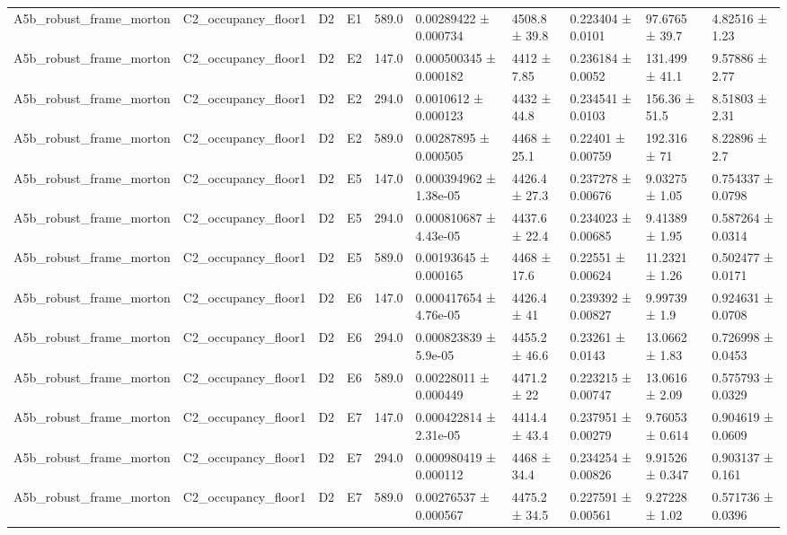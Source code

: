 \begin{table}
\begin{tabular}{llllllllll}
A5b\_robust\_frame\_morton & C2\_occupancy\_floor1 & D2 & E1 & 589.0 & 0.00289422 ± 0.000734 & 4508.8 ± 39.8 & 0.223404 ± 0.0101 & 97.6765 ± 39.7 & 4.82516 ± 1.23 \\
A5b\_robust\_frame\_morton & C2\_occupancy\_floor1 & D2 & E2 & 147.0 & 0.000500345 ± 0.000182 & 4412 ± 7.85 & 0.236184 ± 0.0052 & 131.499 ± 41.1 & 9.57886 ± 2.77 \\
A5b\_robust\_frame\_morton & C2\_occupancy\_floor1 & D2 & E2 & 294.0 & 0.0010612 ± 0.000123 & 4432 ± 44.8 & 0.234541 ± 0.0103 & 156.36 ± 51.5 & 8.51803 ± 2.31 \\
A5b\_robust\_frame\_morton & C2\_occupancy\_floor1 & D2 & E2 & 589.0 & 0.00287895 ± 0.000505 & 4468 ± 25.1 & 0.22401 ± 0.00759 & 192.316 ± 71 & 8.22896 ± 2.7 \\
A5b\_robust\_frame\_morton & C2\_occupancy\_floor1 & D2 & E5 & 147.0 & 0.000394962 ± 1.38e-05 & 4426.4 ± 27.3 & 0.237278 ± 0.00676 & 9.03275 ± 1.05 & 0.754337 ± 0.0798 \\
A5b\_robust\_frame\_morton & C2\_occupancy\_floor1 & D2 & E5 & 294.0 & 0.000810687 ± 4.43e-05 & 4437.6 ± 22.4 & 0.234023 ± 0.00685 & 9.41389 ± 1.95 & 0.587264 ± 0.0314 \\
A5b\_robust\_frame\_morton & C2\_occupancy\_floor1 & D2 & E5 & 589.0 & 0.00193645 ± 0.000165 & 4468 ± 17.6 & 0.22551 ± 0.00624 & 11.2321 ± 1.26 & 0.502477 ± 0.0171 \\
A5b\_robust\_frame\_morton & C2\_occupancy\_floor1 & D2 & E6 & 147.0 & 0.000417654 ± 4.76e-05 & 4426.4 ± 41 & 0.239392 ± 0.00827 & 9.99739 ± 1.9 & 0.924631 ± 0.0708 \\
A5b\_robust\_frame\_morton & C2\_occupancy\_floor1 & D2 & E6 & 294.0 & 0.000823839 ± 5.9e-05 & 4455.2 ± 46.6 & 0.23261 ± 0.0143 & 13.0662 ± 1.83 & 0.726998 ± 0.0453 \\
A5b\_robust\_frame\_morton & C2\_occupancy\_floor1 & D2 & E6 & 589.0 & 0.00228011 ± 0.000449 & 4471.2 ± 22 & 0.223215 ± 0.00747 & 13.0616 ± 2.09 & 0.575793 ± 0.0329 \\
A5b\_robust\_frame\_morton & C2\_occupancy\_floor1 & D2 & E7 & 147.0 & 0.000422814 ± 2.31e-05 & 4414.4 ± 43.4 & 0.237951 ± 0.00279 & 9.76053 ± 0.614 & 0.904619 ± 0.0609 \\
A5b\_robust\_frame\_morton & C2\_occupancy\_floor1 & D2 & E7 & 294.0 & 0.000980419 ± 0.000112 & 4468 ± 34.4 & 0.234254 ± 0.00826 & 9.91526 ± 0.347 & 0.903137 ± 0.161 \\
A5b\_robust\_frame\_morton & C2\_occupancy\_floor1 & D2 & E7 & 589.0 & 0.00276537 ± 0.000567 & 4475.2 ± 34.5 & 0.227591 ± 0.00561 & 9.27228 ± 1.02 & 0.571736 ± 0.0396 \\

\end{tabular}
\end{table}
